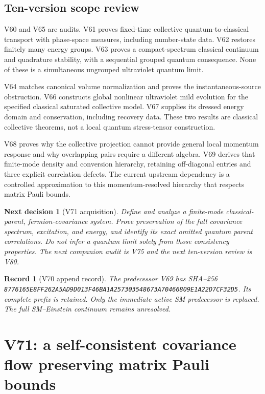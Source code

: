 \documentclass[11pt]{article}
\newtheorem{decision}[theorem]{Next decision}
\newtheorem{record}[theorem]{Record}
\theoremstyle{remark}
\begin{document}
\subsection{Ten-version scope review}

V60 and V65 are audits.  V61 proves fixed-time
collective quantum-to-classical transport with
phase-space measures, including number-state data.
V62 restores finitely many energy groups.
V63 proves a compact-spectrum classical continuum
and quadrature stability, with a sequential grouped
quantum consequence.  None of these is a simultaneous
ungrouped ultraviolet quantum limit.

V64 matches canonical volume normalization and
proves the instantaneous-source obstruction.
V66 constructs global nonlinear ultraviolet mild
evolution for the specified classical saturated
collective model.  V67 supplies its dressed energy
domain and conservation, including recovery data.
These two results are classical collective theorems,
not a local quantum stress-tensor construction.

V68 proves why the collective projection cannot
provide general local momentum response and why
overlapping pairs require a different algebra.
V69 derives that finite-mode density and conversion
hierarchy, retaining off-diagonal entries and three
explicit correlation defects.  The current upstream
dependency is a controlled approximation to this
momentum-resolved hierarchy that respects matrix
Pauli bounds.

\begin{decision}[V71 acquisition]
\label{dec:v20v70-next}
Define and analyze a finite-mode classical-parent,
fermion-covariance system.  Prove preservation of
the full covariance spectrum, excitation, and
energy, and identify its exact omitted quantum
parent correlations.  Do not infer a quantum
limit solely from those consistency properties.
The next companion audit is V75 and the next
ten-version review is V80.
\end{decision}

\begin{record}[V70 append record]
\label{rec:v20v70}
The predecessor V69 has SHA--256
\texttt{8776165E8FF262A5AD9D013F46BA1A257303548673A70466809E1A22D7CF32D5}.
Its complete prefix is retained.  Only the immediate
active SM predecessor is replaced.  The full
SM--Einstein continuum remains unresolved.
\end{record}


\section{V71: a self-consistent covariance flow preserving matrix Pauli bounds}
\label{sec:v20v71}
\end{document}
